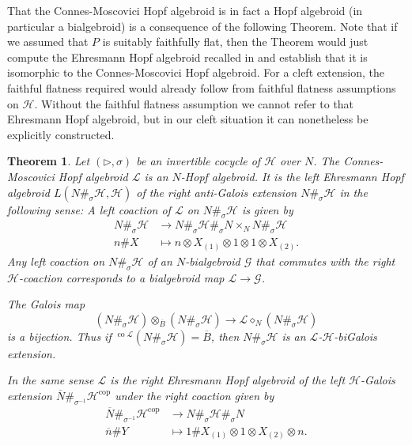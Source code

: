 \documentclass[a4paper,reqno]{amsart}
\numberwithin{equation}{section}
\theoremstyle{plain}
\newtheorem{thm}{Theorem}[section]
\theoremstyle{remark}
\numberwithin{equation}{section}
\newcommand\inv{^{-1}}
\newcommand{\ot}{\otimes}
\newcommand\ol{\overline}
\renewcommand{\o}{{}_{\scriptscriptstyle{(1)}}}
\renewcommand{\t}{{}_{\scriptscriptstyle{(2)}}}
\newcommand\ou[1]{\otimes_{#1}}
\newcommand{\la}{{\triangleright}}
\newcommand{\CH}{\mathcal{H}}
\newcommand{\CL}{\mathcal{L}}
\newcommand\co{{\operatorname{co}}}
\newcommand\cop{{\operatorname{cop}}}
\begin{document}
That the Connes-Moscovici Hopf algebroid is in fact a Hopf algebroid (in particular a bialgebroid) is a consequence of the following Theorem. Note that if we assumed that $P$ is suitably faithfully flat, then  the Theorem would just compute the Ehresmann Hopf algebroid recalled in  and establish that it is isomorphic to the Connes-Moscovici Hopf algebroid. For a cleft extension, the faithful flatness required would already follow from faithful flatness assumptions on $\CH$.  Without the faithful flatness assumption we cannot refer to that Ehresmann Hopf algebroid, but in our cleft situation it can nonetheless be explicitly constructed. 
\begin{thm}\label{Ehresmann in the cleft case}
    Let $(\la,\sigma)$ be an invertible cocycle of $\CH$ over $N$. The Connes-Moscovici  Hopf algebroid $\CL$  is an $N$-Hopf algebroid. It is the   left Ehresmann Hopf algebroid $L(N\#_\sigma\CH,\CH)$ of the right anti-Galois extension $N\#_\sigma\CH$ in the following sense: A left coaction of  $\CL$ on $N\#_\sigma\CH$ is given by
    \begin{align*}
      N\#_\sigma\CH&\to N\#_\sigma\CH\#_\sigma N\times_N N \#_\sigma\CH\\
      n\# X&\mapsto n\ot X\o\ot 1\ot 1\ot X\t.
    \end{align*}
    Any left coaction on $N\#_\sigma\CH$ of an $N$-bialgebroid $\mathcal G$ that commutes with the right $\CH$-coaction corresponds to a bialgebroid map $ \CL \to\mathcal G$. 
   
    The Galois map
    \[(N\#_\sigma\CH)\ou {\ol B}(N\#_\sigma\CH)\to \CL\diamond_N(N\#_\sigma\CH)\]
    is a bijection. Thus if $^{\co \CL}(N\#_\sigma\CH)=\ol B$, then $N\#_\sigma\CH$ is an $\CL$-$\CH$-biGalois extension.

    In the same sense $\CL$ is the right Ehresmann Hopf algebroid of the left $\CH$-Galois extension $\ol N\#_{\sigma\inv}\CH^{\cop}$ under the right coaction given by
    \begin{align*}
        \ol N\#_{\sigma\inv}\CH^{\cop}&\to N\#_\sigma\CH\#_\sigma N\\
        \ol n\# Y&\mapsto 1\# X\o\ot 1\ot X\t\ot n.
    \end{align*}
 \end{thm}
\end{document}
